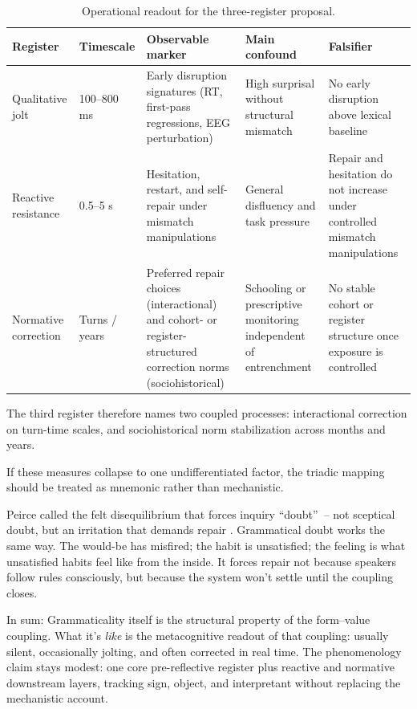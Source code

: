 \begin{table}[h]
\centering
\small
\begin{tabular}{@{}p{}p{}p{}p{}p{}@{}}
\toprule
\textbf{Register} & \textbf{Timescale} & \textbf{Observable marker} & \textbf{Main confound} & \textbf{Falsifier} \\
\midrule
Qualitative jolt & 100--800 ms & Early disruption signatures (RT, first-pass regressions, EEG perturbation) & High surprisal without structural mismatch & No early disruption above lexical baseline \\
Reactive resistance & 0.5--5 s & Hesitation, restart, and self-repair under mismatch manipulations & General disfluency and task pressure & Repair and hesitation do not increase under controlled mismatch manipulations \\
Normative correction & Turns / years & Preferred repair choices (interactional) and cohort- or register-structured correction norms (sociohistorical) & Schooling or prescriptive monitoring independent of entrenchment & No stable cohort or register structure once exposure is controlled \\
\bottomrule
\end{tabular}
\caption{Operational readout for the three-register proposal.}
\label{tab:14:three-register-operational}
\end{table}

The third register therefore names two coupled processes: interactional correction on turn-time scales, and sociohistorical norm stabilization across months and years.

If these measures collapse to one undifferentiated factor, the triadic mapping should be treated as mnemonic rather than mechanistic.

Peirce called the felt disequilibrium that forces inquiry \enquote{doubt}~-- not sceptical doubt, but an irritation that demands repair \citep[CP~5.374]{peirce1931cp}. Grammatical doubt works the same way. The would-be has misfired; the habit is unsatisfied; the feeling is what unsatisfied habits feel like from the inside. It forces repair not because speakers follow rules consciously, but because the system won't settle until the coupling closes.

In sum: Grammaticality itself is the structural property of the form--value coupling. What it's \emph{like} is the metacognitive readout of that coupling: usually silent, occasionally jolting, and often corrected in real time. The phenomenology claim stays modest: one core pre-reflective register plus reactive and normative downstream layers, tracking sign, object, and interpretant without replacing the mechanistic account.


